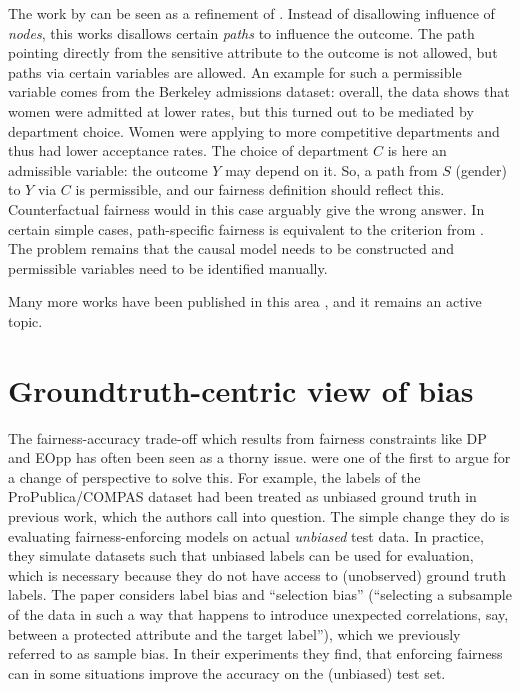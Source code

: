 The work by \citet{chiappa2019path} can be seen as a refinement of \citet{kilbertus2017avoiding}.
Instead of disallowing influence of \emph{nodes}, this works disallows certain \emph{paths} to influence the outcome.
The path pointing directly from the sensitive attribute to the outcome is not allowed,
but paths via certain variables are allowed.
An example for such a permissible variable comes from the Berkeley admissions dataset:
overall, the data shows that women were admitted at lower rates,
but this turned out to be mediated by department choice.
Women were applying to more competitive departments and thus had lower acceptance rates.
The choice of department \(C\) is here an admissible variable:
the outcome \(Y\) may depend on it.
So, a path from \(S\) (gender) to \(Y\) via \(C\) is permissible, and our fairness definition should reflect this.
Counterfactual fairness \citep{kusner2017counterfactual} would in this case arguably give the wrong answer.
In certain simple cases, path-specific fairness is equivalent to the criterion from \citet{kilbertus2017avoiding}.
The problem remains that the causal model needs to be constructed
and permissible variables need to be identified manually.

Many more works have been published in this area \citep[\eg,][]{wu2019pc,kilbertus2020sensitivity,creager2020causal},
and it remains an active topic.
%


\section{Groundtruth-centric view of bias}%
\label{sec:groundtruth-centric-view-of-bias}
The fairness-accuracy trade-off which results from fairness constraints like \ac{DP} and \ac{EOpp}
has often been seen as a thorny issue.
\citet{wick2019unlocking} were one of the first to argue for a change of perspective to solve this.
For example, the labels of the ProPublica/COMPAS dataset had been treated as unbiased ground truth in previous work,
which the authors call into question.
The simple change they do is evaluating fairness-enforcing models on actual \emph{unbiased} test data.
In practice, they simulate datasets such that unbiased labels can be used for evaluation,
which is necessary because they do not have access to (unobserved) ground truth labels.
The paper considers label bias and ``selection bias''
(``selecting a subsample of the data in such a way that happens to introduce unexpected correlations,
say, between a protected attribute and the target label''),
which we previously referred to as sample bias.
In their experiments they find,
that enforcing fairness can in some situations improve the accuracy on the (unbiased) test set.

